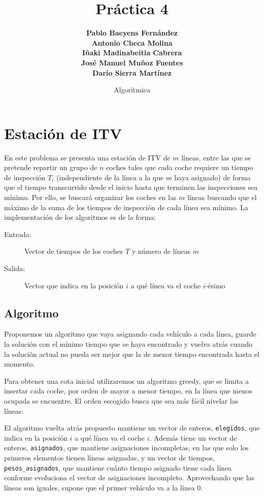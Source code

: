 \documentclass[a4paper, 11pt]{article}
\title{\Huge \textbf{Práctica 4}}
\author{\textbf{Pablo Baeyens Fernández} \\ \textbf{Antonio Checa Molina} \\
	\textbf{Iñaki Madinabeitia Cabrera} \\  \textbf{José Manuel Muñoz Fuentes} \\
	\textbf{Darío Sierra Martínez} \\ }
\date{Algorítmica}
\begin{document}
	\maketitle
	\tableofcontents
	\newpage

\section{Estación de ITV}

En este problema se presenta una estación de ITV de $m$ líneas, entre las que
se pretende repartir un grupo de $n$ coches tales que cada coche requiere un
tiempo de inspección $T_i$ (independiente de la línea a la que se haya asignado)
de forma que el tiempo transcurrido desde el inicio hasta que terminen las
inspecciones sea mínimo. Por ello, se buscará organizar los coches en las $m$
líneas buscando que el máximo de la suma de los tiempos de inspección de cada
línea sea mínimo. La implementación de los algoritmos es de la forma:
\begin{description}
	\item[Entrada:] Vector de tiempos de los coches $T$ y número de líneas $m$
	\item[Salida:] Vector que indica en la posición $i$ a qué línea va el coche $i$-ésimo
\end{description}

\subsection{Algoritmo}

Proponemos un algoritmo que vaya asignando cada vehículo a cada línea, guarde la solución con el mínimo tiempo que se haya encontrado y vuelva atrás cuando la solución actual no pueda ser mejor que la de menor tiempo encontrada hasta el momento.

Para obtener una cota inicial utilizaremos un algoritmo greedy, que se limita a insertar cada coche, por orden de mayor a menor tiempo, en la línea que menos ocupada se encuentre. El orden escogido busca que sea más fácil nivelar las líneas:



El algoritmo vuelta atrás propuesto mantiene un vector de enteros, \texttt{elegidos}, que indica en la posición $i$ a qué línea va el coche $i$. Además tiene un vector de enteros, \texttt{asignados}, que mantiene asignaciones incompletas, en las que solo los primeros elementos tienen líneas asignadas, y un vector de tiempos, \texttt{pesos\_asignados}, que mantiene cuánto tiempo asignado tiene cada línea conforme evoluciona el vector de asignaciones incompleto. Aprovechando que las líneas son iguales, supone que el primer vehículo va a la línea 0.
\end{document}
